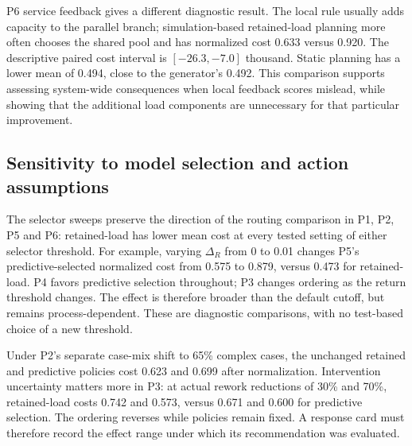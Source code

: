 P6 service feedback gives a different diagnostic result. The local rule usually adds capacity to the parallel branch; simulation-based retained-load planning more often chooses the shared pool and has normalized cost 0.633 versus 0.920. The descriptive paired cost interval is $[-26.3,-7.0]$ thousand. Static planning has a lower mean of 0.494, close to the generator's 0.492. This comparison supports assessing system-wide consequences when local feedback scores mislead, while showing that the additional load components are unnecessary for that particular improvement.

\subsection{Sensitivity to model selection and action assumptions}
The selector sweeps preserve the direction of the routing comparison in P1, P2, P5 and P6: retained-load has lower mean cost at every tested setting of either selector threshold. For example, varying $\Delta_R$ from 0 to 0.01 changes P5's predictive-selected normalized cost from 0.575 to 0.879, versus 0.473 for retained-load. P4 favors predictive selection throughout; P3 changes ordering as the return threshold changes. The effect is therefore broader than the default cutoff, but remains process-dependent. These are diagnostic comparisons, with no test-based choice of a new threshold.

Under P2's separate case-mix shift to 65\% complex cases, the unchanged retained and predictive policies cost 0.623 and 0.699 after normalization. Intervention uncertainty matters more in P3: at actual rework reductions of 30\% and 70\%, retained-load costs 0.742 and 0.573, versus 0.671 and 0.600 for predictive selection. The ordering reverses while policies remain fixed. A response card must therefore record the effect range under which its recommendation was evaluated.
